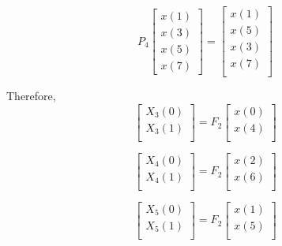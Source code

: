 \documentclass[journal,12pt,twocolumn]{IEEEtran}
\renewcommand\thesection{\arabic{section}}
\begin{document}
\begin{enumerate}[label=\arabic*.,ref=\thesection.\theenumi]
\begin{equation}
P_{4}
\begin{bmatrix}
x(1) \\ 
x(3) \\ 
x(5) \\
x(7)
\end{bmatrix}
 = 
\begin{bmatrix}
x(1) \\ 
x(5) \\ 
x(3) \\ 
x(7) \\
\end{bmatrix}
\end{equation}

Therefore,
\begin{equation}
\begin{bmatrix}
X_{3}(0) \\ 
X_{3}(1)\\ 
\end{bmatrix}
= F_{2}
\begin{bmatrix}
x(0) \\ 
x(4) \\ 
\end{bmatrix}
\end{equation}

\begin{equation}
\begin{bmatrix}
X_{4}(0) \\ 
X_{4}(1)\\ 
\end{bmatrix}
= F_{2}
\begin{bmatrix}
x(2) \\ 
x(6) \\ 
\end{bmatrix}
\end{equation}

\begin{equation}
\begin{bmatrix}
X_{5}(0) \\ 
X_{5}(1)\\ 
\end{bmatrix}
= F_{2}
\begin{bmatrix}
x(1) \\ 
x(5) \\ 
\end{bmatrix}
\end{equation}


\end{enumerate}
\end{document}
